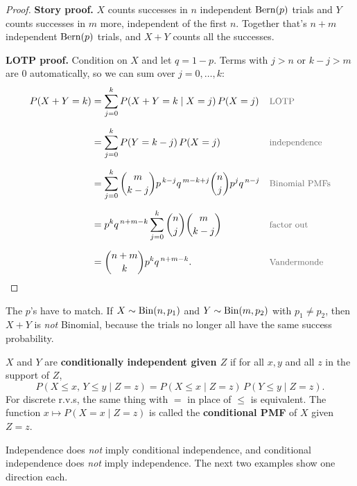 \begin{proof}
\textbf{Story proof.} $X$ counts successes in $n$ independent $\operatorname{Bern}(p)$ trials and $Y$ counts successes in $m$ more, independent of the first $n$. Together that's $n + m$ independent $\operatorname{Bern}(p)$ trials, and $X + Y$ counts all the successes.

\medskip

\textbf{LOTP proof.} Condition on $X$ and let $q = 1 - p$. Terms with $j > n$ or $k - j > m$ are $0$ automatically, so we can sum over $j = 0, \dots, k$:
\medskip
\begin{align*}
P(X + Y = k)
  &= \sum_{j=0}^{k} P(X + Y = k \mid X = j)\,P(X = j)
  && \by{LOTP} \\[0.6em]
  &= \sum_{j=0}^{k} P(Y = k - j)\,P(X = j)
  && \by{independence} \\[0.6em]
  &= \sum_{j=0}^{k} \binom{m}{k-j} p^{\,k-j} q^{\,m-k+j} \binom{n}{j} p^{j} q^{\,n-j}
  && \by{Binomial PMFs} \\[0.6em]
  &= p^{k} q^{\,n+m-k} \sum_{j=0}^{k} \binom{n}{j}\binom{m}{k-j}
  && \by{factor out} \\[0.6em]
  &= \binom{n+m}{k} p^{k} q^{\,n+m-k}.
  && \by{Vandermonde}
\end{align*}
\end{proof}

\bigskip

\begin{pitfall}
The $p$'s have to match. If $X \sim \operatorname{Bin}(n, p_1)$ and $Y \sim \operatorname{Bin}(m, p_2)$ with $p_1 \ne p_2$, then $X + Y$ is \emph{not} Binomial, because the trials no longer all have the same success probability.
\end{pitfall}

\bigskip

\begin{definition}\label{def:condindep}
$X$ and $Y$ are \textbf{conditionally independent given $Z$} if for all $x, y$ and all $z$ in the support of $Z$,
\medskip
\[
P(X \le x,\, Y \le y \mid Z = z) = P(X \le x \mid Z = z)\,P(Y \le y \mid Z = z).
\]
\medskip
For discrete r.v.s, the same thing with $=$ in place of $\le$ is equivalent. The function $x \mapsto P(X = x \mid Z = z)$ is called the \textbf{conditional PMF} of $X$ given $Z = z$.
\end{definition}

\bigskip

\begin{remark}
Independence does \emph{not} imply conditional independence, and conditional independence does \emph{not} imply independence. The next two examples show one direction each.
\end{remark}

